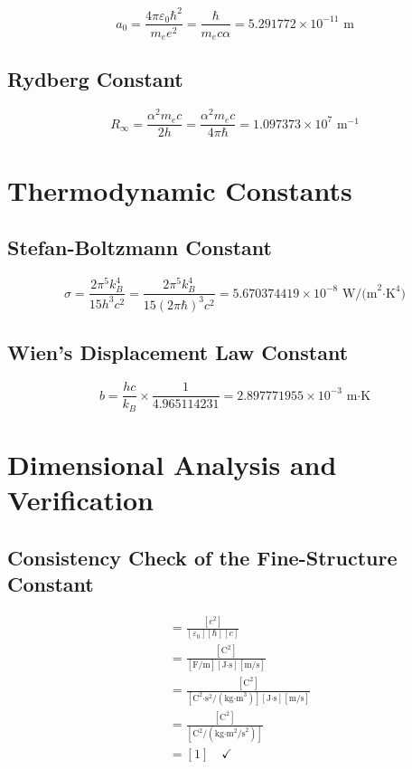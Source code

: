 	\begin{equation}
		a_0 = \frac{4\pi\varepsilon_0\hbar^2}{m_e e^2} = \frac{\hbar}{m_e c \alpha} = 5.291772 \times 10^{-11} \text{ m}
	\end{equation}
	
	\subsection{Rydberg Constant}
	
	\begin{equation}
		R_\infty = \frac{\alpha^2 m_e c}{2h} = \frac{\alpha^2 m_e c}{4\pi\hbar} = 1.097373 \times 10^7 \text{ m}^{-1}
	\end{equation}
	
	\section{Thermodynamic Constants}
	
	\subsection{Stefan-Boltzmann Constant}
	
	\begin{equation}
		\sigma = \frac{2\pi^5 k_B^4}{15 h^3 c^2} = \frac{2\pi^5 k_B^4}{15 (2\pi\hbar)^3 c^2} = 5.670374419 \times 10^{-8} \text{ W/(m}^2\text{·K}^4\text{)}
	\end{equation}
	
	\subsection{Wien's Displacement Law Constant}
	
	\begin{equation}
		b = \frac{hc}{k_B} \times \frac{1}{4.965114231} = 2.897771955 \times 10^{-3} \text{ m·K}
	\end{equation}
	
	\section{Dimensional Analysis and Verification}
	
	\subsection{Consistency Check of the Fine-Structure Constant}
	
	\begin{align}
		[\alpha] &= \frac{[e^2]}{[\varepsilon_0][\hbar][c]}\\
		&= \frac{[\text{C}^2]}{[\text{F/m}][\text{J·s}][\text{m/s}]}\\
		&= \frac{[\text{C}^2]}{[\text{C}^2\text{·s}^2/(\text{kg·m}^3)][\text{J·s}][\text{m/s}]}\\
		&= \frac{[\text{C}^2]}{[\text{C}^2/(\text{kg·m}^2\text{/s}^2)]}\\
		&= [1] \quad \checkmark
	\end{align}
	
